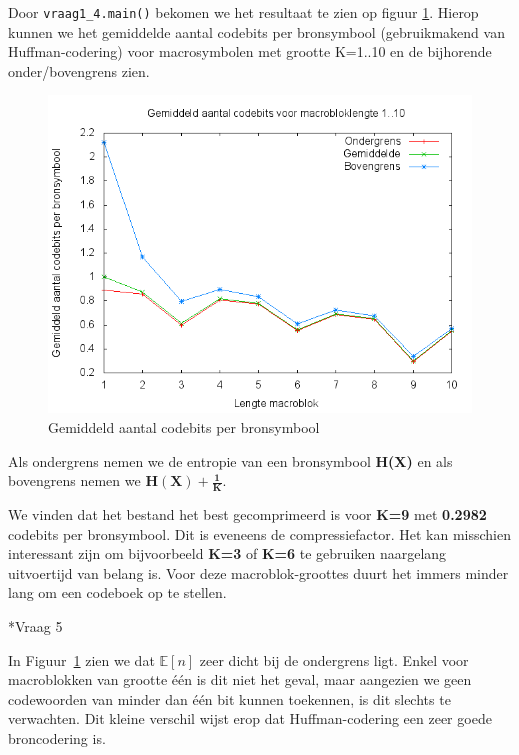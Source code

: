 \documentclass[]{article}
\begin{document}
\begin{section}
\begin{subsection}
	Door \texttt{vraag1\_4.main()} bekomen we het resultaat te zien op figuur \ref{fig:codebits}.
	Hierop kunnen we het gemiddelde aantal codebits per bronsymbool
        (gebruikmakend van Huffman-codering) voor macrosymbolen met
        grootte K=1..10 en de bijhorende onder/bovengrens zien.
        \begin{figure}[h]
            \centering
            \includegraphics[width=\textwidth]{vraag1_4.png}
            \caption{Gemiddeld aantal codebits per bronsymbool}
            \label{fig:codebits}
        \end{figure}

        Als ondergrens nemen we de entropie van een bronsymbool
        \textbf{H(X)} en als bovengrens nemen we
        $\mathbf{H(X) +\frac{1}{K}}$.

        We vinden dat het bestand het best gecomprimeerd is voor
        \textbf{K=9} met \textbf{0.2982} codebits per bronsymbool. Dit
        is eveneens de compressiefactor. Het kan misschien  interessant
        zijn om bijvoorbeeld \textbf{K=3} of \textbf{K=6} te gebruiken
        naargelang uitvoertijd van belang is. Voor deze
        macroblok-groottes duurt het immers minder lang om een codeboek
        op te stellen.
		
    \end{subsection}

    \begin{subsection}*{Vraag 5}

        In Figuur~\ref{fig:codebits} zien we dat $\mathbb{E}[n]$ zeer
        dicht bij de ondergrens ligt. Enkel voor macroblokken van
        grootte \'e\'en is dit niet het geval, maar aangezien we geen
        codewoorden van minder dan \'e\'en bit kunnen toekennen, is dit
        slechts te verwachten. Dit kleine verschil wijst erop dat
        Huffman-codering een zeer goede broncodering is.


\end{subsection}
\end{section}
\end{document}
